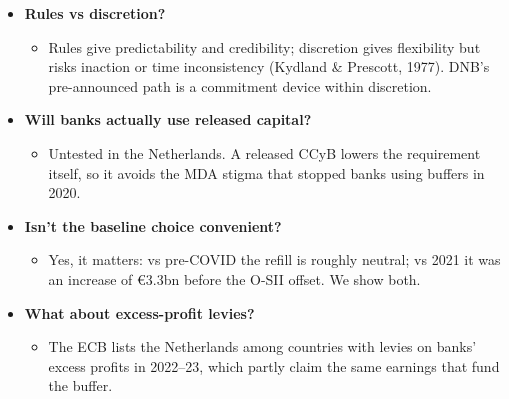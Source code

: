 \documentclass[10pt]{article}
\begin{document}
\begin{tcolorbox}[sbox,width=0.495\linewidth,height=14.6cm,nobeforeafter,box align=top,fit basedim=11pt,colframe=nlred!70,colbacktitle=nlred!8,coltitle=nlred,title=LIKELY CHALLENGES · definitions and logic]
\begin{itemize}
\item[\textcolor{navy}{\textbf{Q}}] \textbf{Rules vs discretion?}
\begin{itemize}
\item Rules give predictability and credibility; discretion gives flexibility but risks inaction or time inconsistency (Kydland \& Prescott, 1977). DNB's pre-announced path is a commitment device within discretion.
\end{itemize}
\item[\textcolor{navy}{\textbf{Q}}] \textbf{Will banks actually use released capital?}
\begin{itemize}
\item Untested in the Netherlands. A released CCyB lowers the requirement itself, so it avoids the MDA stigma that stopped banks using buffers in 2020.
\end{itemize}
\item[\textcolor{navy}{\textbf{Q}}] \textbf{Isn't the baseline choice convenient?}
\begin{itemize}
\item Yes, it matters: vs pre-COVID the refill is roughly neutral; vs 2021 it was an increase of €3.3bn before the O-SII offset. We show both.
\end{itemize}
\item[\textcolor{navy}{\textbf{Q}}] \textbf{What about excess-profit levies?}
\begin{itemize}
\item The ECB lists the Netherlands among countries with levies on banks' excess profits in 2022–23, which partly claim the same earnings that fund the buffer.
\end{itemize}
\end{itemize}
\end{tcolorbox}
\newpage
\end{document}
